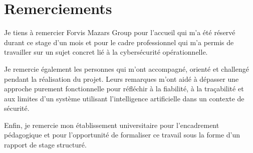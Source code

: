\chapter*{Remerciements}

Je tiens à remercier Forvis Mazars Group pour l'accueil qui m'a été réservé durant ce stage d'un mois et pour le cadre professionnel qui m'a permis de travailler sur un sujet concret lié à la cybersécurité opérationnelle.

Je remercie également les personnes qui m'ont accompagné, orienté et challengé pendant la réalisation du projet. Leurs remarques m'ont aidé à dépasser une approche purement fonctionnelle pour réfléchir à la fiabilité, à la traçabilité et aux limites d'un système utilisant l'intelligence artificielle dans un contexte de sécurité.

Enfin, je remercie mon établissement universitaire pour l'encadrement pédagogique et pour l'opportunité de formaliser ce travail sous la forme d'un rapport de stage structuré.
